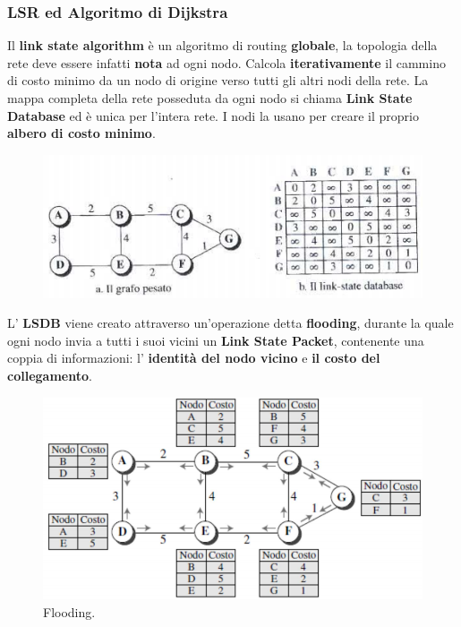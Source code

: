 \documentclass[11pt,a4paper,oneside]{book}
\theoremstyle{definition}
\begin{document}
\subsubsection{LSR ed Algoritmo di Dijkstra}
Il \textbf{link state algorithm} è un algoritmo di routing \textbf{globale}, la topologia della rete deve essere infatti \textbf{nota} ad ogni nodo. Calcola \textbf{iterativamente} il cammino di costo minimo da un nodo di origine verso tutti gli altri nodi della rete. La mappa completa della rete posseduta da ogni nodo si chiama \textbf{Link State Database} ed è unica per l'intera rete. I nodi la usano per creare il proprio \textbf{albero di costo minimo}.

\begin{figure}[!h]
	\centering
	\includegraphics[scale=0.62]{Immagini/LSDB.png}
\end{figure}

\pagebreak

L' \textbf{LSDB} viene creato attraverso un'operazione detta \textbf{flooding}, durante la quale ogni nodo invia a tutti i suoi vicini un \textbf{Link State Packet}, contenente una coppia di informazioni: l' \textbf{identità del nodo vicino} e \textbf{il costo del collegamento}.

\begin{figure}[!h]
	\centering
	\includegraphics[scale=0.45]{Immagini/Flooding.png}
	\caption{Flooding.}
\end{figure}
\end{document}
